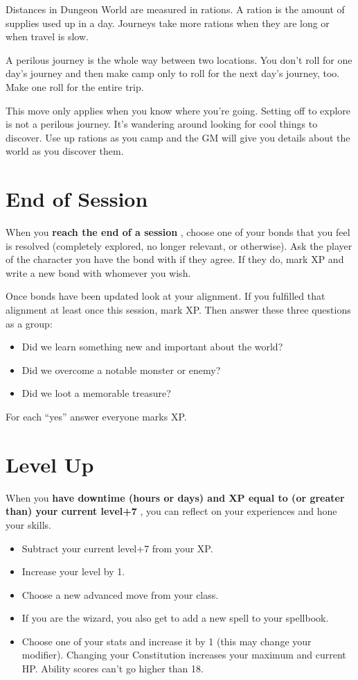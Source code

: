 Distances in Dungeon World are measured in rations. A ration is the amount of supplies used up in a day. Journeys take more rations when they are long or when travel is slow.

A perilous journey is the whole way between two locations. You don't roll for one day's journey and then make camp only to roll for the next day's journey, too. Make one roll for the entire trip.

This move only applies when you know where you're going. Setting off to explore is not a perilous journey. It's wandering around looking for cool things to discover. Use up rations as you camp and the GM will give you details about the world as you discover them.
\section*{End of Session}
\HRule
When you \textbf{reach the end of a session}
, choose one of your bonds that you feel is resolved (completely explored, no longer relevant, or otherwise). Ask the player of the character you have the bond with if they agree. If they do, mark XP and write a new bond with whomever you wish.

Once bonds have been updated look at your alignment. If you fulfilled that alignment at least once this session, mark XP\@. Then answer these three questions as a group:
\begin{itemize}
\item Did we learn something new and important about the world?
\item Did we overcome a notable monster or enemy?
\item Did we loot a memorable treasure?
\end{itemize}
\HRule

For each ``yes'' answer everyone marks XP\@.
\section*{Level Up}
\HRule
When you \textbf{have downtime (hours or days) and XP equal to (or greater than) your current level+7}
, you can reflect on your experiences and hone your skills.
\begin{itemize}
\item Subtract your current level+7 from your XP\@.
\item Increase your level by 1.
\item Choose a new advanced move from your class.
\item If you are the wizard, you also get to add a new spell to your spellbook.
\item Choose one of your stats and increase it by 1 (this may change your modifier). Changing your Constitution increases your maximum and current HP\@. Ability scores can't go higher than 18.
\end{itemize}
\HRule
